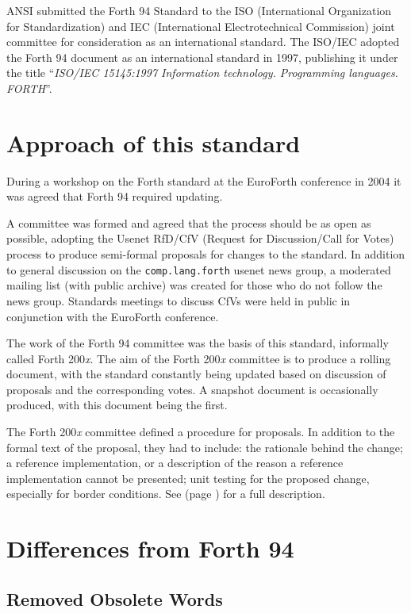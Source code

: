 ANSI submitted the Forth 94 Standard to the
ISO (International Organization for Standardization) and
IEC (International Electrotechnical Commission) joint committee for
consideration as an international standard.
The ISO/IEC adopted the Forth 94 document as an international standard
in 1997, publishing it under the title ``\emph{ISO/IEC 15145:1997
Information technology.  Programming languages.  FORTH}''.


\section{Approach of this standard} %
\label{diff:approach}

During a workshop on the Forth standard at the EuroForth conference in
2004 it was agreed that Forth 94 required updating.

A committee was formed and agreed that the process should be as open
as possible, adopting the Usenet RfD/CfV (Request for Discussion/Call
for Votes) process to produce semi-formal proposals for changes to the
standard.  In addition to general discussion on the \texttt{comp.lang.forth}
usenet news group, a moderated mailing list (with public archive) was
created for those who do not follow the news group.
Standards meetings to discuss CfVs were held in public in
conjunction with the EuroForth conference.

The work of the Forth 94 committee was the basis of this standard,
informally called Forth 200\emph{x}.  The aim of the Forth 200\emph{x}
committee is to produce a rolling document, with the standard constantly
being updated based on discussion of proposals and the corresponding
votes.  A snapshot document is occasionally produced, with this document
being the first.

The Forth 200\emph{x} committee defined a procedure for proposals.  In
addition to the formal text of the proposal, they had to include:
the rationale behind the change;
a reference implementation, or a description of the reason a reference
implementation cannot be presented;
unit testing for the proposed change, especially for border conditions.
See  (page \pageref{process}) for a full description.


\section{Differences from Forth 94} %
\label{diff:forth94}

\subsection{Removed Obsolete Words} %
\label{diff:ans:obsolete}


